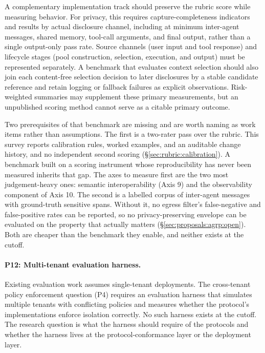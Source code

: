 A complementary implementation track should preserve the
rubric score while measuring behavior. For privacy, this
requires capture-completeness indicators and results by
actual disclosure channel, including at minimum inter-agent
messages, shared memory, tool-call arguments, and final
output, rather than a single output-only pass rate.
Source channels (user input and tool response) and
lifecycle stages (pool construction, selection, execution,
and output) must be represented separately. A benchmark
that evaluates context selection should also join each
content-free selection decision to later disclosures by a
stable candidate reference and retain logging or fallback
failures as explicit observations. Risk-weighted summaries
may supplement these primary measurements, but an
unpublished scoring method cannot serve as a citable
primary outcome.

Two prerequisites of that benchmark are missing and are
worth naming as work items rather than assumptions. The
first is a two-rater pass over the rubric. This survey
reports calibration rules, worked examples, and an auditable
change history, and no independent second scoring
(\S\ref{sec:rubric:calibration}). A benchmark built on a
scoring instrument whose reproducibility has never been
measured inherits that gap. The axes to measure first
are the two most judgement-heavy ones: semantic
interoperability (Axis 9) and the observability component of
Axis 10. The
second is a labelled corpus of inter-agent messages with
ground-truth sensitive spans. Without it, no egress filter's
false-negative and false-positive rates can be reported, so
no privacy-preserving envelope can be evaluated on the
property that actually matters
(\S\ref{sec:proposals:agrp:open}). Both are cheaper than the
benchmark they enable, and neither exists at the cutoff.

\paragraph{P12: Multi-tenant evaluation harness.}
Existing evaluation work assumes single-tenant
deployments. The cross-tenant policy enforcement
question (P4) requires an evaluation harness that
simulates multiple tenants with conflicting
policies and measures whether the protocol's
implementations enforce isolation correctly. No
such harness exists at the cutoff. The research
question is what the harness should require of
the protocols and whether the harness lives at the
protocol-conformance layer or the deployment
layer.

